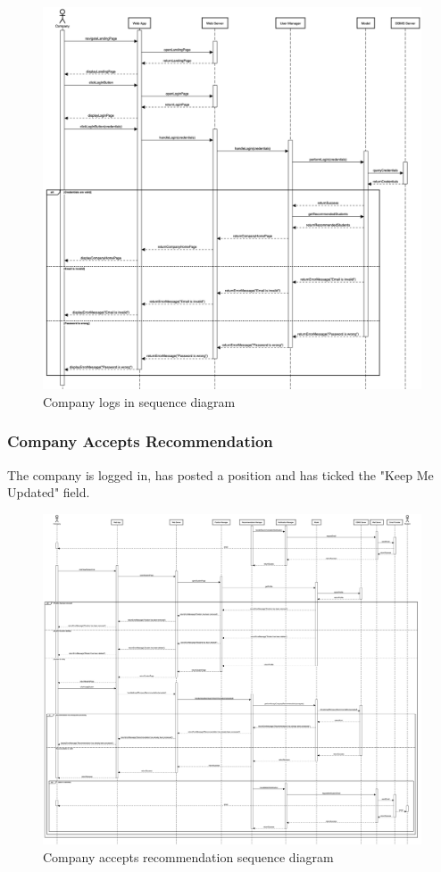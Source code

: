 \begin{figure}[h]
    \centering
    \includegraphics[width=16cm]{images/sequence-diagrams/company-logs-in.png}
    \caption{Company logs in sequence diagram}
\end{figure}

\clearpage
\subsubsection{Company Accepts Recommendation}
The company is logged in, has posted a position and has ticked the "Keep Me Updated" field.

\begin{figure}[h]
    \centering
    \includegraphics[width=16cm]{images/sequence-diagrams/company-accepts-recommendation.png}
    \caption{Company accepts recommendation sequence diagram}
\end{figure}

